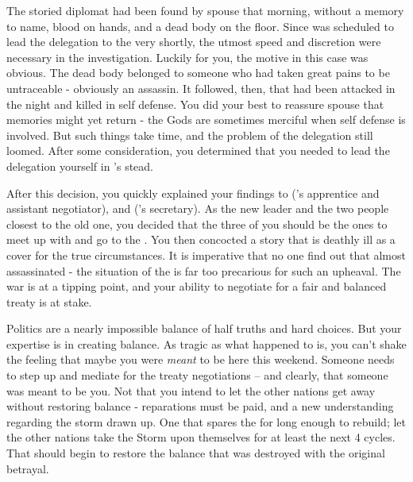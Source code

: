 \documentclass[char]{GL2020}
\begin{document}
The storied diplomat \cHeadDiplomat{} had been found by \cHeadDiplomat{\their} spouse that morning, without a memory to \cHeadDiplomat{\their} name, blood on \cHeadDiplomat{\their} hands, and a dead body on the floor. Since \cHeadDiplomat{} was scheduled to lead the delegation to the \pSc{} very shortly, the utmost speed and discretion were necessary in the investigation. Luckily for you, the motive in this case was obvious. The dead body belonged to someone who had taken great pains to be untraceable - obviously an assassin. It followed, then, that \cHeadDiplomat{} had been attacked in the night and killed in self defense. You did your best to reassure \cHeadDiplomat{\their} spouse that \cHeadDiplomat{\their} memories might yet return - the Gods are sometimes merciful when self defense is involved. But such things take time, and the problem of the delegation still loomed. After some consideration, you determined that you needed to lead the delegation yourself in \cHeadDiplomat{}’s stead.

After this decision, you quickly explained your findings to \cJuniorStatesman{} (\cHeadDiplomat{}’s apprentice and assistant negotiator), and \cChupLeader{} (\cHeadDiplomat{}’s secretary). As the new leader and the two people closest to the old one, you decided that the three of you should be the ones to meet up with \cBunker{} and go to the \pSc{}. You then concocted a story that \cHeadDiplomat{} is deathly ill as a cover for the true circumstances. It is imperative that no one find out that \cHeadDiplomat{\they} \cHeadDiplomat{\were} almost assassinated - the situation of the \pShip{} is far too precarious for such an upheaval. The war is at a tipping point, and your ability to negotiate for a fair and balanced treaty is at stake.

Politics are a nearly impossible balance of half truths and hard choices. But your expertise is in creating balance. As tragic as what happened to \cHeadDiplomat{} is, you can’t shake the feeling that maybe you were \emph{meant} to be here this weekend. Someone needs to step up and mediate for the treaty negotiations -- and clearly, that someone was meant to be you. Not that you intend to let the other nations get away without restoring balance - reparations must be paid, and a new understanding regarding the storm drawn up. One that spares the \pShip{} for long enough to rebuild; let the other nations take the Storm upon themselves for at least the next 4 cycles. That should begin to restore the balance that was destroyed with the original betrayal.
\end{document}
